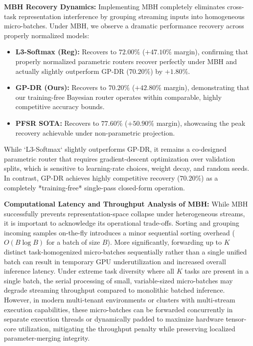 \textbf{MBH Recovery Dynamics:}
Implementing MBH completely eliminates cross-task representation interference by grouping streaming inputs into homogeneous micro-batches. Under MBH, we observe a dramatic performance recovery across properly normalized models:
\begin{itemize}
    \item \textbf{L3-Softmax (Reg):} Recovers to \textbf{$72.00\%$} ($+47.10\%$ margin), confirming that properly normalized parametric routers recover perfectly under MBH and actually slightly outperform GP-DR ($70.20\%$) by $+1.80\%$.
    \item \textbf{GP-DR (Ours):} Recovers to \textbf{$70.20\%$} ($+42.80\%$ margin), demonstrating that our training-free Bayesian router operates within comparable, highly competitive accuracy bounds.
    \item \textbf{PFSR SOTA:} Recovers to \textbf{$77.60\%$} ($+50.90\%$ margin), showcasing the peak recovery achievable under non-parametric projection.
\end{itemize}
While `L3-Softmax` slightly outperforms GP-DR, it remains a co-designed parametric router that requires gradient-descent optimization over validation splits, which is sensitive to learning-rate choices, weight decay, and random seeds. In contrast, GP-DR achieves highly competitive recovery ($70.20\%$) as a completely *training-free* single-pass closed-form operation.

\textbf{Computational Latency and Throughput Analysis of MBH:}
While MBH successfully prevents representation-space collapse under heterogeneous streams, it is important to acknowledge its operational trade-offs. Sorting and grouping incoming samples on-the-fly introduces a minor sequential sorting overhead ($O(B \log B)$ for a batch of size $B$). More significantly, forwarding up to $K$ distinct task-homogenized micro-batches sequentially rather than a single unified batch can result in temporary GPU underutilization and increased overall inference latency. Under extreme task diversity where all $K$ tasks are present in a single batch, the serial processing of small, variable-sized micro-batches may degrade streaming throughput compared to monolithic batched inference. However, in modern multi-tenant environments or clusters with multi-stream execution capabilities, these micro-batches can be forwarded concurrently in separate execution threads or dynamically padded to maximize hardware tensor-core utilization, mitigating the throughput penalty while preserving localized parameter-merging integrity.

